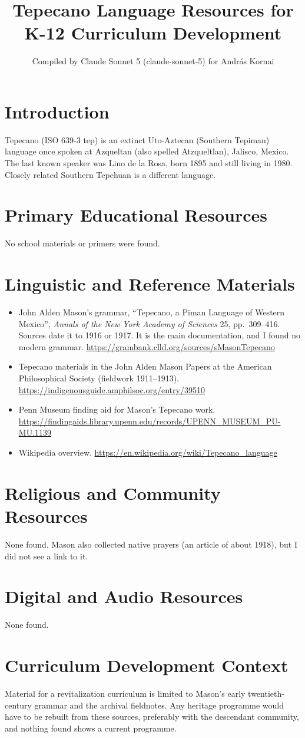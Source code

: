\documentclass[12pt]{article}
\title{Tepecano Language Resources for K-12 Curriculum Development}
\author{Compiled by Claude Sonnet 5 (claude-sonnet-5) for Andr\'as Kornai}
\date{}
\begin{document}
\maketitle

\section{Introduction}
Tepecano (ISO 639-3 tep) is an extinct Uto-Aztecan (Southern Tepiman) language once spoken at Azqueltan (also spelled Atzqueltlan), Jalisco, Mexico. The last known speaker was Lino de la Rosa, born 1895 and still living in 1980. Closely related Southern Tepehuan is a different language.

\section{Primary Educational Resources}
No school materials or primers were found.

\section{Linguistic and Reference Materials}
\begin{itemize}
\item John Alden Mason's grammar, ``Tepecano, a Piman Language of Western Mexico'', \emph{Annals of the New York Academy of Sciences} 25, pp.\ 309--416. Sources date it to 1916 or 1917. It is the main documentation, and I found no modern grammar. \url{https://grambank.clld.org/sources/sMasonTepecano}
\item Tepecano materials in the John Alden Mason Papers at the American Philosophical Society (fieldwork 1911--1913). \url{https://indigenousguide.amphilsoc.org/entry/39510}
\item Penn Museum finding aid for Mason's Tepecano work. \url{https://findingaids.library.upenn.edu/records/UPENN_MUSEUM_PU-MU.1139}
\item Wikipedia overview. \url{https://en.wikipedia.org/wiki/Tepecano_language}
\end{itemize}

\section{Religious and Community Resources}
None found. Mason also collected native prayers (an article of about 1918), but I did not see a link to it.

\section{Digital and Audio Resources}
None found.

\section{Curriculum Development Context}
Material for a revitalization curriculum is limited to Mason's early twentieth-century grammar and the archival fieldnotes. Any heritage programme would have to be rebuilt from these sources, preferably with the descendant community, and nothing found shows a current programme.
\end{document}
